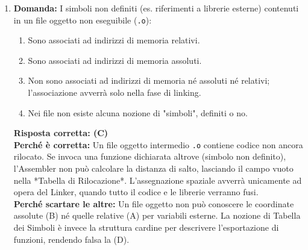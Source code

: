 \documentclass[12pt, a4paper]{article}
\begin{document}
\begin{enumerate}
\newpage

    \textbf{Risposta corretta: (C)} \\
    \textbf{Perché è corretta:} Per definizione, una libreria statica (un file \texttt{.a}) contiene codice macchina già compilato che il Linker copia fisicamente e in modo permanente all'interno del file eseguibile. Una volta completato il file \texttt{a.out} o \texttt{.exe}, questo diventa del tutto indipendente; la libreria non viene più letta dal Sistema Operativo durante il caricamento o l'esecuzione. \\
    \textbf{Perché scartare le altre:} L'opzione (D) descrive esplicitamente il comportamento delle librerie *dinamiche* (es. \texttt{.so} o \texttt{.dll}). L'opzione (B) fa confusione col ruolo del preprocessore o dell'assembler stesso. La (A) è del tutto infondata.

    \item \textbf{Domanda:} I simboli non definiti (es. riferimenti a librerie esterne) contenuti in un file oggetto non eseguibile (\texttt{.o}):
    \begin{enumerate}[label=(\Alph*)]
        \item Sono associati ad indirizzi di memoria relativi.
        \item Sono associati ad indirizzi di memoria assoluti.
        \item Non sono associati ad indirizzi di memoria né assoluti né relativi; l'associazione avverrà solo nella fase di linking.
        \item Nei file non esiste alcuna nozione di "simboli", definiti o no.
    \end{enumerate}
    \textbf{Risposta corretta: (C)} \\
    \textbf{Perché è corretta:} Un file oggetto intermedio \texttt{.o} contiene codice non ancora rilocato. Se invoca una funzione dichiarata altrove (simbolo non definito), l'Assembler non può calcolare la distanza di salto, lasciando il campo vuoto nella *Tabella di Rilocazione*. L'assegnazione spaziale avverrà unicamente ad opera del Linker, quando tutto il codice e le librerie verranno fusi. \\
    \textbf{Perché scartare le altre:} Un file oggetto non può conoscere le coordinate assolute (B) né quelle relative (A) per variabili esterne. La nozione di Tabella dei Simboli è invece la struttura cardine per descrivere l'esportazione di funzioni, rendendo falsa la (D).


\end{enumerate}
\end{document}
